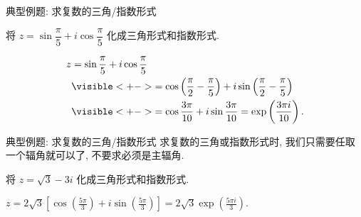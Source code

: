 \begin{frame}{典型例题: 求复数的三角/指数形式}
\onslide<+->
\begin{example}
将 $z=\sin\dfrac\pi5+i\cos\dfrac\pi5$ 化成三角形式和指数形式.
\end{example}
\onslide<+->
\begin{solution}
\vspace{-\baselineskip}
\begin{align*}
z&=\sin\frac\pi5+i\cos\frac\pi5\\
&\visible<+->{=\cos\left(\frac\pi2-\frac\pi5\right)+i\sin\left(\frac\pi2-\frac\pi5\right)}\\
&\visible<+->{=\cos\frac{3\pi}{10}+i\sin\frac{3\pi}{10}=\exp\left(\frac{3\pi i}{10}\right).}
\end{align*}
\end{solution}
\end{frame}


\begin{frame}{典型例题: 求复数的三角/指数形式}
\onslide<+->
求复数的三角或指数形式时, 我们只需要任取一个辐角就可以了, 不要求必须是主辐角.
\onslide<+->
\begin{exercise}
将 $z=\sqrt 3-3i$ 化成三角形式和指数形式.
\end{exercise}
\onslide<+->
\begin{answer}
$\displaystyle z=2\sqrt3\left[\cos\left(\frac{5\pi}3\right)+i\sin\left(\frac{5\pi}3\right)\right]
=2\sqrt3\exp\left(\frac{5\pi i}3\right)$.
\end{answer}
\end{frame}


